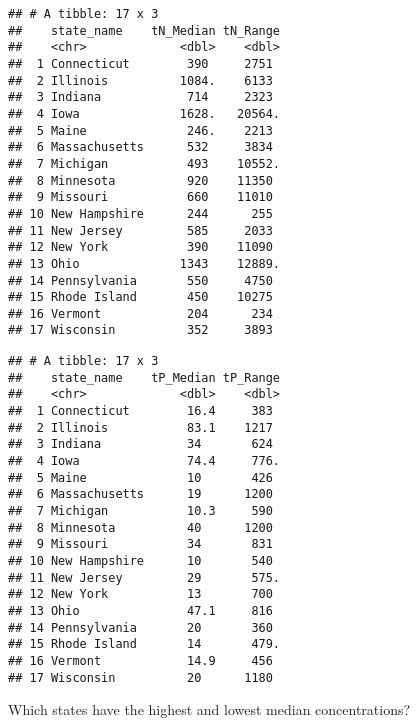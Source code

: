 \documentclass[]{article}
\newenvironment{Shaded}{\begin{snugshade}}{\end{snugshade}}
\newcommand{\DataTypeTok}[1]{\textcolor[rgb]{0.13,0.29,0.53}{#1}}
\newcommand{\KeywordTok}[1]{\textcolor[rgb]{0.13,0.29,0.53}{\textbf{#1}}}
\newcommand{\NormalTok}[1]{#1}
\newcommand{\OperatorTok}[1]{\textcolor[rgb]{0.81,0.36,0.00}{\textbf{#1}}}
\newcommand{\StringTok}[1]{\textcolor[rgb]{0.31,0.60,0.02}{#1}}
\begin{document}
\begin{verbatim}
## # A tibble: 17 x 3
##    state_name    tN_Median tN_Range
##    <chr>             <dbl>    <dbl>
##  1 Connecticut        390     2751 
##  2 Illinois          1084.    6133 
##  3 Indiana            714     2323 
##  4 Iowa              1628.   20564.
##  5 Maine              246.    2213 
##  6 Massachusetts      532     3834 
##  7 Michigan           493    10552.
##  8 Minnesota          920    11350 
##  9 Missouri           660    11010 
## 10 New Hampshire      244      255 
## 11 New Jersey         585     2033 
## 12 New York           390    11090 
## 13 Ohio              1343    12889.
## 14 Pennsylvania       550     4750 
## 15 Rhode Island       450    10275 
## 16 Vermont            204      234 
## 17 Wisconsin          352     3893
\end{verbatim}

\begin{Shaded}
\end{Shaded}

\begin{verbatim}
## # A tibble: 17 x 3
##    state_name    tP_Median tP_Range
##    <chr>             <dbl>    <dbl>
##  1 Connecticut        16.4     383 
##  2 Illinois           83.1    1217 
##  3 Indiana            34       624 
##  4 Iowa               74.4     776.
##  5 Maine              10       426 
##  6 Massachusetts      19      1200 
##  7 Michigan           10.3     590 
##  8 Minnesota          40      1200 
##  9 Missouri           34       831 
## 10 New Hampshire      10       540 
## 11 New Jersey         29       575.
## 12 New York           13       700 
## 13 Ohio               47.1     816 
## 14 Pennsylvania       20       360 
## 15 Rhode Island       14       479.
## 16 Vermont            14.9     456 
## 17 Wisconsin          20      1180
\end{verbatim}

Which states have the highest and lowest median concentrations?
\end{document}
